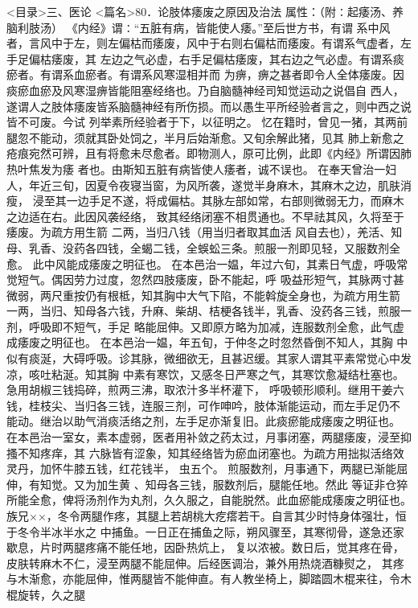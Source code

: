 \documentclass[a4paper,12pt,UTF8,twoside]{ctexbook}
\begin{document}
<目录>三、医论
<篇名>80．论肢体痿废之原因及治法
属性：（附∶起痿汤、养脑利肢汤） 
《内经》谓∶“五脏有病，皆能使人痿。”至后世方书，有谓 
系中风者，言风中于左，则左偏枯而痿废，风中于右则右偏枯而痿废。有谓系气虚者，左手足偏枯痿废，其 
左边之气必虚，右手足偏枯痿废，其右边之气必虚。有谓系痰瘀者。有谓系血瘀者。有谓系风寒湿相并而 
为痹，痹之甚者即令人全体痿废。因痰瘀血瘀及风寒湿痹皆能阻塞经络也。乃自脑髓神经司知觉运动之说倡自 
西人，遂谓人之肢体痿废皆系脑髓神经有所伤损。而以愚生平所经验者言之，则中西之说皆不可废。今试 
列举素所经验者于下，以征明之。 
忆在籍时，曾见一猪，其两前腿忽不能动，须就其卧处饲之，半月后始渐愈。又旬余解此猪，见其 
肺上新愈之疮痕宛然可辨，且有将愈未尽愈者。即物测人，原可比例，此即《内经》所谓因肺热叶焦发为痿 
者也。由斯知五脏有病皆使人痿者，诚不误也。 
在奉天曾治一妇人，年近三旬，因夏令夜寝当窗，为风所袭，遂觉半身麻木，其麻木之边，肌肤消瘦， 
浸至其一边手足不遂，将成偏枯。其脉左部如常，右部则微弱无力，而麻木之边适在右。此因风袭经络， 
致其经络闭塞不相贯通也。不早祛其风，久将至于痿废。为疏方用生箭 二两，当归八钱（用当归者取其血活 
风自去也），羌活、知母、乳香、没药各四钱，全蝎二钱，全蜈蚣三条。煎服一剂即见轻，又服数剂全愈。 
此中风能成痿废之明征也。 
在本邑治一媪，年过六旬，其素日气虚，呼吸常觉短气。偶因劳力过度，忽然四肢痿废，卧不能起，呼 
吸益形短气，其脉两寸甚微弱，两尺重按仍有根柢，知其胸中大气下陷，不能斡旋全身也，为疏方用生箭 
一两，当归、知母各六钱，升麻、柴胡、桔梗各钱半，乳香、没药各三钱，煎服一剂，呼吸即不短气，手足 
略能屈伸。又即原方略为加减，连服数剂全愈，此气虚成痿废之明征也。 
在本邑治一媪，年五旬，于仲冬之时忽然昏倒不知人，其胸 
中似有痰涎，大碍呼吸。诊其脉，微细欲无，且甚迟缓。其家人谓其平素常觉心中发凉，咳吐粘涎。知其胸 
中素有寒饮，又感冬日严寒之气，其寒饮愈凝结杜塞也。急用胡椒三钱捣碎，煎两三沸，取浓汁多半杯灌下， 
呼吸顿形顺利。继用干姜六钱，桂枝尖、当归各三钱，连服三剂，可作呻吟，肢体渐能运动，而左手足仍不 
能动。继治以助气消痰活络之剂，左手足亦渐复旧。此痰瘀能成痿废之明征也。 
在本邑治一室女，素本虚弱，医者用补敛之药太过，月事闭塞，两腿痿废，浸至抑搔不知疼痒，其 
六脉皆有涩象，知其经络皆为瘀血闭塞也。为疏方用拙拟活络效灵丹，加怀牛膝五钱，红花钱半， 虫五个。 
煎服数剂，月事通下，两腿已渐能屈伸，有知觉。又为加生黄 、知母各三钱，服数剂后，腿能任地。然此 
等证非仓猝所能全愈，俾将汤剂作为丸剂，久久服之，自能脱然。此血瘀能成痿废之明征也。 
族兄××，冬令两腿作疼，其腿上若胡桃大疙瘩若干。自言其少时恃身体强壮，恒于冬令半冰半水之 
中捕鱼。一日正在捕鱼之际，朔风骤至，其寒彻骨，遂急还家歇息，片时两腿疼痛不能任地，因卧热炕上， 
复以浓被。数日后，觉其疼在骨，皮肤转麻木不仁，浸至两腿不能屈伸。后经医调治，兼外用热烧酒糠熨之， 
其疼与木渐愈，亦能屈伸，惟两腿皆不能伸直。有人教坐椅上，脚踏圆木棍来往，令木棍旋转，久之腿 
\end{document}
